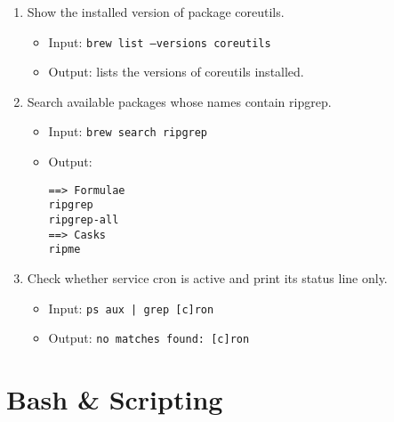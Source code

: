 \begin{enumerate}
\item Show the installed version of package coreutils.
\begin{itemize}
\item Input: \texttt{brew list --versions coreutils}
\item Output: lists the versions of coreutils installed.
\end{itemize}

\item Search available packages whose names contain ripgrep.
\begin{itemize}
\item Input: \texttt{brew search ripgrep}
\item Output:
\begin{verbatim}
==> Formulae
ripgrep
ripgrep-all
==> Casks
ripme
\end{verbatim}
\end{itemize}

\item Check whether service cron is active and print its status line only.
\begin{itemize}
\item Input: \texttt{ps aux | grep [c]ron}
\item Output: \texttt{no matches found: [c]ron}
\end{itemize}
\end{enumerate}

\section{Bash \& Scripting}

